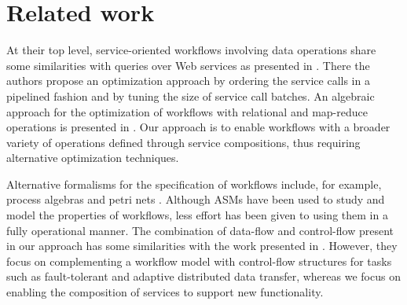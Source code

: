 
\section{Related work} \label{sec:relatedWork}

At their top level, service-oriented workflows involving data operations share some similarities with queries over Web services as presented in \cite{Srivastava:2006:QOO:1182635.1164159}. There the authors propose an optimization approach by ordering the service calls in a pipelined fashion and by tuning the size of service call batches. An algebraic approach for the optimization of workflows with relational and map-reduce operations is presented in \cite{DBLP:journals/pvldb/OgasawaraOVDPM11}. Our approach is to enable workflows with a broader variety of operations defined through service compositions, thus requiring alternative optimization techniques.

Alternative formalisms for the specification of workflows include, for example, process algebras \cite{Curcin:2011:STW:2048456.2048467} and petri nets \cite{Hidders:2008:DDL:1340791.1340907}. Although ASMs have been used to study and model the properties of workflows, less effort has been given to using them in a fully operational manner. The combination of data-flow and control-flow present in our approach has some similarities with the work presented in \cite{Bowers:2006:ESR:1129755.1130113}. However, they focus on complementing a workflow model with control-flow structures for tasks such as fault-tolerant and adaptive distributed data transfer, whereas we focus on enabling the composition of services to support new functionality.

